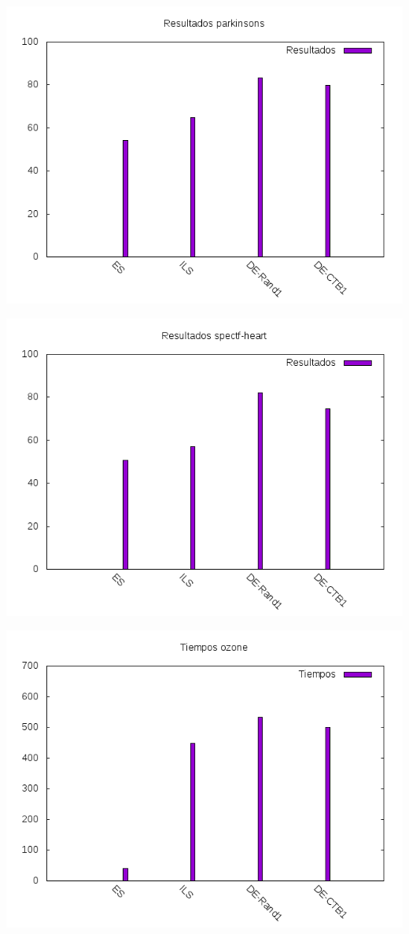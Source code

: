 \documentclass[12pt,a4paper]{article}
\begin{document}
	\includegraphics[scale=0.8]{./Imagenes/Resultados/parkinsons.png}
	
	\includegraphics[scale=0.8]{./Imagenes/Resultados/spectf-heart.png}
	
	\includegraphics[scale=0.8]{./Imagenes/Tiempos/tiempos_ozone.png}
	
\end{document}

